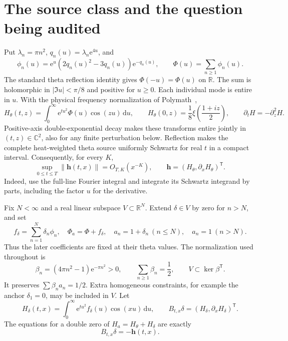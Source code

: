 \documentclass[11pt]{article}
\theoremstyle{remark}\newtheorem{remark}[theorem]{Remark}
\newcommand{\R}{\mathbb R}
\newcommand{\C}{\mathbb C}
\newcommand{\norm}[1]{\left\lVert #1\right\rVert}
\newcommand{\dd}{\,\mathrm d}
\newcommand{\thetaH}{H_\theta}
\newcommand{\jet}{\mathbf h}
\newcommand{\e}{\mathrm e}
\begin{document}
\section{The source class and the question being audited}
Put $\lambda_n=\pi n^2$, $q_n(u)=\lambda_n\e^{4u}$, and
\begin{equation}\label{eq:source}
 \phi_n(u)=\e^u(2q_n(u)^2-3q_n(u))\e^{-q_n(u)},\qquad
 \Phi(u)=\sum_{n\ge1}\phi_n(u).
\end{equation}
The standard theta reflection identity gives $\Phi(-u)=\Phi(u)$ on $\R$. The sum is holomorphic in $|\Im u|<\pi/8$ and positive for $u\ge0$. Each individual mode is entire in $u$. With the physical frequency normalization of Polymath~\cite{polymath},
\begin{equation}\label{eq:heat}
 \thetaH(t,z)=\int_0^\infty\e^{tu^2}\Phi(u)\cos(zu)\dd u,
 \qquad \thetaH(0,z)=\frac18\xi\left(\frac{1+iz}{2}\right),
 \qquad \partial_t H=-\partial_z^2H.
\end{equation}
Positive-axis double-exponential decay makes these transforms entire jointly in $(t,z)\in\C^2$, also for any finite perturbation below. Reflection makes the complete heat-weighted theta source uniformly Schwartz for real $t$ in a compact interval. Consequently, for every $K$,
\begin{equation}\label{eq:schwartz}
 \sup_{0\le t\le T}\norm{\jet(t,x)}=O_{T,K}(x^{-K}),\qquad
 \jet=(\thetaH,\partial_x\thetaH)^{\mathsf T}.
\end{equation}
Indeed, use the full-line Fourier integral and integrate its Schwartz integrand by parts, including the factor $u$ for the derivative.

Fix $N<\infty$ and a real linear subspace $V\subset\R^N$. Extend $\delta\in V$ by zero for $n>N$, and set
\begin{equation}\label{eq:perturb}
 f_\delta=\sum_{n=1}^N\delta_n\phi_n,\quad
 \Phi_a=\Phi+f_\delta,\quad a_n=1+\delta_n\ (n\le N),\quad a_n=1\ (n>N).
\end{equation}
Thus the later coefficients are fixed at their theta values. The normalization used throughout is
\begin{equation}\label{eq:beta}
 \beta_n=(4\pi n^2-1)\e^{-\pi n^2}>0,\qquad
 \sum_{n\ge1}\beta_n=\frac12,\qquad V\subset\ker\beta^{\mathsf T}.
\end{equation}
It preserves $\sum\beta_n a_n=1/2$. Extra homogeneous constraints, for example the anchor $\delta_1=0$, may be included in $V$. Let
\begin{equation}\label{eq:B}
 H_\delta(t,x)=\int_0^\infty\e^{tu^2}f_\delta(u)\cos(xu)\dd u,
 \qquad B_{t,x}\delta=(H_\delta,\partial_xH_\delta)^{\mathsf T}.
\end{equation}
The equations for a double zero of $H_a=\thetaH+H_\delta$ are exactly
\begin{equation}\label{eq:double}
 B_{t,x}\delta=-\jet(t,x).
\end{equation}
\end{document}
